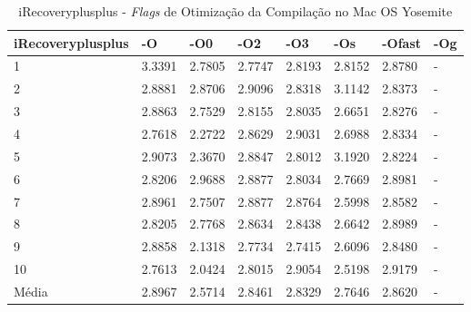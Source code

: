\begin{apendicesenv}
\begin{table}[!ht]
\tiny
\centering
\caption{iRecoveryplusplus - \textit{Flags} de Otimização da Compilação no Mac OS Yosemite}
\label{tab:otimizacao_compilacao:mac:irecoveryplusplus}
\begin{tabular}{llllllll}
\textbf{iRecoveryplusplus} & \textbf{-O}  & \textbf{-O0}   & \textbf{-O2} & \textbf{-O3} & \textbf{-Os} & \textbf{-Ofast} & \textbf{-Og} \\ \toprule
1                          & 3.3391       &   2.7805       &  2.7747      &  2.8193      &  2.8152      &   2.8780        &  -           \\ 
2                          & 2.8881       &   2.8706       &  2.9096      &  2.8318      &  3.1142      &   2.8373        &  -           \\ 
3                          & 2.8863       &   2.7529       &  2.8155      &  2.8035      &  2.6651      &   2.8276        &  -           \\ 
4                          & 2.7618       &   2.2722       &  2.8629      &  2.9031      &  2.6988      &   2.8334        &  -           \\ 
5                          & 2.9073       &   2.3670      &  2.8847      &  2.8012      &  3.1920      &   2.8224        &  -           \\ 
6                          & 2.8206       &   2.9688      &  2.8877      &  2.8034      &  2.7669      &   2.8981        &  -           \\ 
7                          & 2.8961       &   2.7507      &  2.8877      &  2.8764      &  2.5998      &   2.8582        &  -           \\ 
8                          & 2.8205       &   2.7768      &  2.8634      &  2.8438      &  2.6642      &   2.8989        &  -           \\ 
9                          & 2.8858       &   2.1318      &  2.7734      &  2.7415      &  2.6096      &   2.8480        &  -           \\ 
10                         & 2.7613       &   2.0424      &  2.8015      &  2.9054      &  2.5198      &   2.9179        &  -           \\ \bottomrule
Média                      & 2.8967       &   2.5714      &  2.8461      &  2.8329      &  2.7646      &   2.8620        &  -           \\ 
\end{tabular}
\end{table}



\end{apendicesenv}
